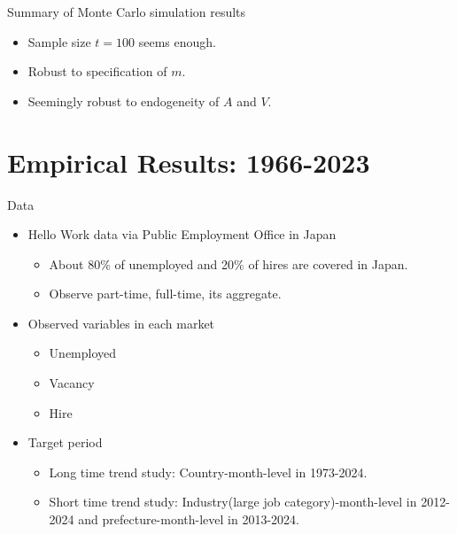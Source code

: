 \documentclass[aspectratio=169]{beamer}
\begin{document}
\begin{frame}{Summary of Monte Carlo simulation results}
\begin{itemize}
    \item Sample size $t=100$ seems enough.
    \item Robust to specification of $m$.
    \item Seemingly robust to endogeneity of $A$ and $V$.
\end{itemize}
    
\end{frame}






\section{Empirical Results: 1966-2023}

\begin{frame}{Data}
  \begin{itemize}
      \item Hello Work data via Public Employment Office in Japan
      \begin{itemize}
          \item About 80\% of unemployed and 20\% of hires are covered in Japan.
          \item Observe part-time, full-time, its aggregate.
      \end{itemize}
      \item Observed variables in each market
      \begin{itemize}
          \item Unemployed
          \item Vacancy
          \item Hire
      \end{itemize}
      \item Target period
      \begin{itemize}
          \item Long time trend study: Country-month-level in 1973-2024.
          \item Short time trend study: Industry(large job category)-month-level in 2012-2024 and prefecture-month-level in 2013-2024.
      \end{itemize}
      
  \end{itemize}
\end{frame}
\end{document}
